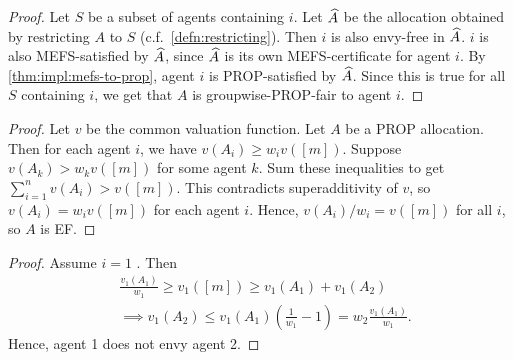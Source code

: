\begin{proof}
Let $S$ be a subset of agents containing $i$.
Let $\widehat{A}$ be the allocation obtained by restricting $A$ to $S$ (c.f.~\cref{defn:restricting}).
Then $i$ is also envy-free in $\widehat{A}$.
$i$ is also MEFS-satisfied by $\widehat{A}$, since $\widehat{A}$ is its own MEFS-certificate for agent $i$.
By \cref{thm:impl:mefs-to-prop}, agent $i$ is PROP-satisfied by $\widehat{A}$.
Since this is true for all $S$ containing $i$,
we get that $A$ is groupwise-PROP-fair to agent $i$.
\end{proof}

\begin{proof}
Let $v$ be the common valuation function. Let $A$ be a PROP allocation.
Then for each agent $i$, we have $v(A_i) \ge w_iv([m])$.
Suppose $v(A_k) > w_kv([m])$ for some agent $k$.
Sum these inequalities to get $\sum_{i=1}^n v(A_i) > v([m])$.
This contradicts superadditivity of $v$, so $v(A_i) = w_iv([m])$ for each agent $i$.
Hence, $v(A_i)/w_i = v([m])$ for all $i$, so $A$ is EF.
\end{proof}

\begin{proof}
Assume $i=1$ \wLoG. Then
\begin{align*}
& \frac{v_1(A_1)}{w_1} \ge v_1([m]) \ge v_1(A_1) + v_1(A_2)
\\ &\implies v_1(A_2) \le v_1(A_1)\left(\frac{1}{w_1} - 1\right) = w_2 \frac{v_1(A_1)}{w_1}.
\end{align*}
Hence, agent 1 does not envy agent 2.
\end{proof}

